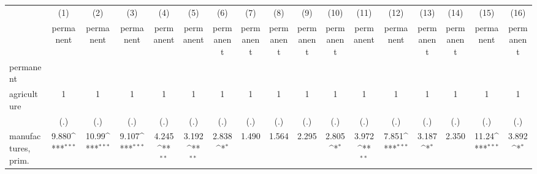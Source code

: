 {
\def\sym#1{\ifmmode^{#1}\else\(^{#1}\)\fi}
\begin{tabular}{l*{16}{c}}
\hline\hline
                    &\multicolumn{1}{c}{(1)}&\multicolumn{1}{c}{(2)}&\multicolumn{1}{c}{(3)}&\multicolumn{1}{c}{(4)}&\multicolumn{1}{c}{(5)}&\multicolumn{1}{c}{(6)}&\multicolumn{1}{c}{(7)}&\multicolumn{1}{c}{(8)}&\multicolumn{1}{c}{(9)}&\multicolumn{1}{c}{(10)}&\multicolumn{1}{c}{(11)}&\multicolumn{1}{c}{(12)}&\multicolumn{1}{c}{(13)}&\multicolumn{1}{c}{(14)}&\multicolumn{1}{c}{(15)}&\multicolumn{1}{c}{(16)}\\
                    &\multicolumn{1}{c}{permanent}&\multicolumn{1}{c}{permanent}&\multicolumn{1}{c}{permanent}&\multicolumn{1}{c}{permanent}&\multicolumn{1}{c}{permanent}&\multicolumn{1}{c}{permanent}&\multicolumn{1}{c}{permanent}&\multicolumn{1}{c}{permanent}&\multicolumn{1}{c}{permanent}&\multicolumn{1}{c}{permanent}&\multicolumn{1}{c}{permanent}&\multicolumn{1}{c}{permanent}&\multicolumn{1}{c}{permanent}&\multicolumn{1}{c}{permanent}&\multicolumn{1}{c}{permanent}&\multicolumn{1}{c}{permanent}\\
\hline
permanent           &                     &                     &                     &                     &                     &                     &                     &                     &                     &                     &                     &                     &                     &                     &                     &                     \\
agriculture         &           1         &           1         &           1         &           1         &           1         &           1         &           1         &           1         &           1         &           1         &           1         &           1         &           1         &           1         &           1         &           1         \\
                    &         (.)         &         (.)         &         (.)         &         (.)         &         (.)         &         (.)         &         (.)         &         (.)         &         (.)         &         (.)         &         (.)         &         (.)         &         (.)         &         (.)         &         (.)         &         (.)         \\
[1em]
manufactures, prim. &       9.880\sym{***}&       10.99\sym{***}&       9.107\sym{***}&       4.245\sym{**} &       3.192\sym{**} &       2.838\sym{*}  &       1.490         &       1.564         &       2.295         &       2.805\sym{*}  &       3.972\sym{**} &       7.851\sym{***}&       3.187\sym{*}  &       2.350         &       11.24\sym{***}&       3.892\sym{*}  \\

\end{tabular}}
